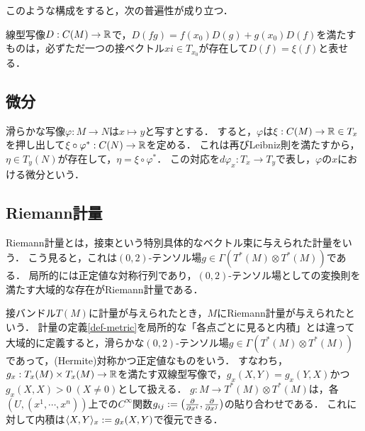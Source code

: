 \documentclass[uplatex,dvipdfmx]{jsreport}
\begin{document}
このような構成をすると，次の普遍性が成り立つ．

\begin{theorem}
    線型写像$D:C(M)\to\mathbb{R}$で，$D(fg)=f(x_0)D(g)+g(x_0)D(f)$を満たすものは，必ずただ一つの接ベクトル$xi\in T_{x_0}$が存在して$D(f)=\xi(f)$と表せる．
\end{theorem}

\subsection{微分}

\begin{definition}
    滑らかな写像$\varphi:M\to N$は$x\mapsto y$と写すとする．
    すると，$\varphi$は$\xi:C(M)\to\mathbb{R}\in T_x$を押し出して$\xi\circ\varphi^*:C(N)\to\mathbb{R}$を定める．
    これは再びLeibniz則を満たすから，$\eta\in T_y(N)$が存在して，$\eta=\xi\circ\varphi^*$．
    この対応を$d\varphi_x:T_x\to T_y$で表し，$\varphi$の$x$における微分という．
\end{definition}

\subsection{Riemann計量}

\begin{tcolorbox}[colframe=ForestGreen, colback=ForestGreen!10!white,breakable,colbacktitle=ForestGreen!40!white,coltitle=black,fonttitle=\bfseries\sffamily,
    title=]
    Riemann計量とは，接束という特別具体的なベクトル束に与えられた計量をいう．
    こう見ると，これは$(0,2)$-テンソル場$g\in\Gamma(T^*(M)\otimes T^*(M))$である．
    局所的には正定値な対称行列であり，$(0,2)$-テンソル場としての変換則を満たす大域的な存在がRiemann計量である．
\end{tcolorbox}

\begin{remarks}
    接バンドル$T(M)$に計量が与えられたとき，$M$にRiemann計量が与えられたという．
    計量の定義\ref{def-metric}を局所的な「各点ごとに見ると内積」とは違って大域的に定義すると，滑らかな$(0,2)$-テンソル場$g\in\Gamma(T^*(M)\otimes T^*(M))$であって，(Hermite)対称かつ正定値なものをいう．
    すなわち，$g_x:T_x(M)\times T_x(M)\to\mathbb{R}$を満たす双線型写像で，$g_x(X,Y)=g_x(Y,X)$かつ$g_x(X,X)>0\;(X\ne 0)$として扱える．
    $g:M\to T^*(M)\otimes T^*(M)$は，各$(U,(x^1,\cdots,x^n))$上での$C^\infty$関数$g_{ij}:=\left(\frac{\partial }{\partial x^i},\frac{\partial }{\partial x^j}\right)$の貼り合わせである．
    これに対して内積は$\langle X,Y\rangle_x:=g_x(X,Y)$で復元できる．
\end{remarks}
\end{document}
